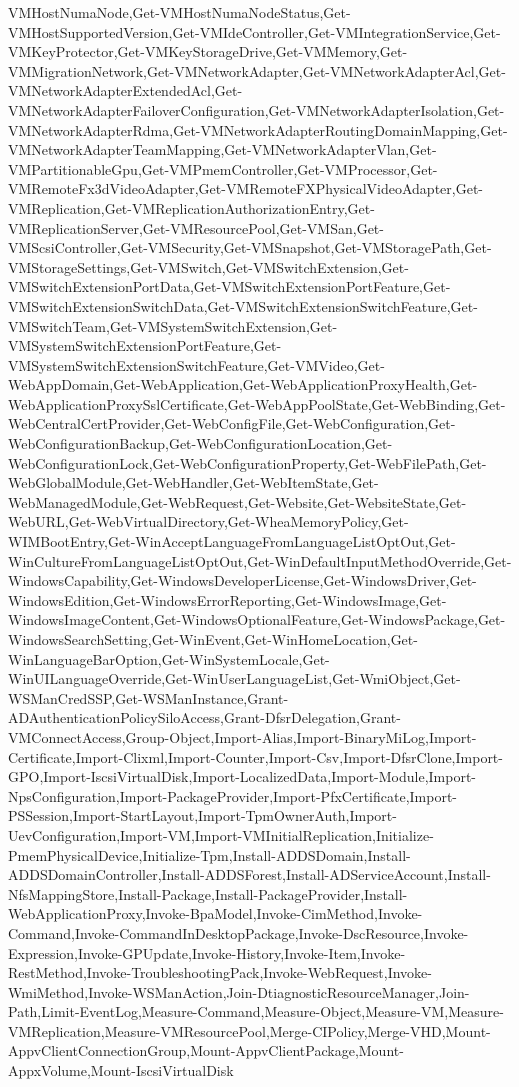 {{VMHostNumaNode,Get-VMHostNumaNodeStatus,Get-VMHostSupportedVersion,Get-VMIdeController,Get-VMIntegrationService,Get-VMKeyProtector,Get-VMKeyStorageDrive,Get-VMMemory,Get-VMMigrationNetwork,Get-VMNetworkAdapter,Get-VMNetworkAdapterAcl,Get-VMNetworkAdapterExtendedAcl,Get-VMNetworkAdapterFailoverConfiguration,Get-VMNetworkAdapterIsolation,Get-VMNetworkAdapterRdma,Get-VMNetworkAdapterRoutingDomainMapping,Get-VMNetworkAdapterTeamMapping,Get-VMNetworkAdapterVlan,Get-VMPartitionableGpu,Get-VMPmemController,Get-VMProcessor,Get-VMRemoteFx3dVideoAdapter,Get-VMRemoteFXPhysicalVideoAdapter,Get-VMReplication,Get-VMReplicationAuthorizationEntry,Get-VMReplicationServer,Get-VMResourcePool,Get-VMSan,Get-VMScsiController,Get-VMSecurity,Get-VMSnapshot,Get-VMStoragePath,Get-VMStorageSettings,Get-VMSwitch,Get-VMSwitchExtension,Get-VMSwitchExtensionPortData,Get-VMSwitchExtensionPortFeature,Get-VMSwitchExtensionSwitchData,Get-VMSwitchExtensionSwitchFeature,Get-VMSwitchTeam,Get-VMSystemSwitchExtension,Get-VMSystemSwitchExtensionPortFeature,Get-VMSystemSwitchExtensionSwitchFeature,Get-VMVideo,Get-WebAppDomain,Get-WebApplication,Get-WebApplicationProxyHealth,Get-WebApplicationProxySslCertificate,Get-WebAppPoolState,Get-WebBinding,Get-WebCentralCertProvider,Get-WebConfigFile,Get-WebConfiguration,Get-WebConfigurationBackup,Get-WebConfigurationLocation,Get-WebConfigurationLock,Get-WebConfigurationProperty,Get-WebFilePath,Get-WebGlobalModule,Get-WebHandler,Get-WebItemState,Get-WebManagedModule,Get-WebRequest,Get-Website,Get-WebsiteState,Get-WebURL,Get-WebVirtualDirectory,Get-WheaMemoryPolicy,Get-WIMBootEntry,Get-WinAcceptLanguageFromLanguageListOptOut,Get-WinCultureFromLanguageListOptOut,Get-WinDefaultInputMethodOverride,Get-WindowsCapability,Get-WindowsDeveloperLicense,Get-WindowsDriver,Get-WindowsEdition,Get-WindowsErrorReporting,Get-WindowsImage,Get-WindowsImageContent,Get-WindowsOptionalFeature,Get-WindowsPackage,Get-WindowsSearchSetting,Get-WinEvent,Get-WinHomeLocation,Get-WinLanguageBarOption,Get-WinSystemLocale,Get-WinUILanguageOverride,Get-WinUserLanguageList,Get-WmiObject,Get-WSManCredSSP,Get-WSManInstance,Grant-ADAuthenticationPolicySiloAccess,Grant-DfsrDelegation,Grant-VMConnectAccess,Group-Object,Import-Alias,Import-BinaryMiLog,Import-Certificate,Import-Clixml,Import-Counter,Import-Csv,Import-DfsrClone,Import-GPO,Import-IscsiVirtualDisk,Import-LocalizedData,Import-Module,Import-NpsConfiguration,Import-PackageProvider,Import-PfxCertificate,Import-PSSession,Import-StartLayout,Import-TpmOwnerAuth,Import-UevConfiguration,Import-VM,Import-VMInitialReplication,Initialize-PmemPhysicalDevice,Initialize-Tpm,Install-ADDSDomain,Install-ADDSDomainController,Install-ADDSForest,Install-ADServiceAccount,Install-NfsMappingStore,Install-Package,Install-PackageProvider,Install-WebApplicationProxy,Invoke-BpaModel,Invoke-CimMethod,Invoke-Command,Invoke-CommandInDesktopPackage,Invoke-DscResource,Invoke-Expression,Invoke-GPUpdate,Invoke-History,Invoke-Item,Invoke-RestMethod,Invoke-TroubleshootingPack,Invoke-WebRequest,Invoke-WmiMethod,Invoke-WSManAction,Join-DtiagnosticResourceManager,Join-Path,Limit-EventLog,Measure-Command,Measure-Object,Measure-VM,Measure-VMReplication,Measure-VMResourcePool,Merge-CIPolicy,Merge-VHD,Mount-AppvClientConnectionGroup,Mount-AppvClientPackage,Mount-AppxVolume,Mount-IscsiVirtualDisk}}
